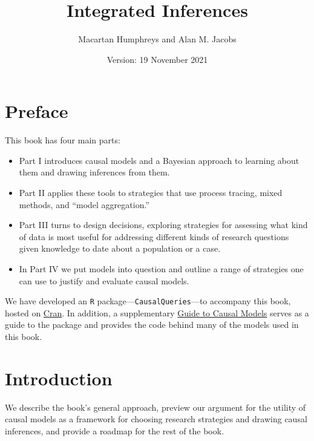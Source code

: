 \documentclass[
  12pt,
]{book}
\title{Integrated Inferences}
\author{Macartan Humphreys and Alan M. Jacobs}
\date{Version: 19 November 2021}
\newenvironment{headerbox}{
  \definecolor{shadecolor}{rgb}{0.8, 0.8, 0.8}  %
  \color{black}
  \begin{shaded}}{\end{shaded}}
\begin{document}
\maketitle

{
\setcounter{tocdepth}{1}
\tableofcontents
}
\hypertarget{preface}{%
\chapter*{Preface}\label{preface}}

This book has four main parts:

\begin{itemize}
\item
  Part I introduces causal models and a Bayesian approach to learning about them and drawing inferences from them.
\item
  Part II applies these tools to strategies that use process tracing, mixed methods, and ``model aggregation.''
\item
  Part III turns to design decisions, exploring strategies for assessing what kind of data is most useful for addressing different kinds of research questions given knowledge to date about a population or a case.
\item
  In Part IV we put models into question and outline a range of strategies one can use to justify and evaluate causal models.
\end{itemize}

We have developed an \texttt{R} package---\texttt{CausalQueries}---to accompany this book, hosted on \href{https://cran.r-project.org/web/packages/CausalQueries/index.html}{Cran}. In addition, a supplementary \href{https://macartan.github.io/causalmodels/}{Guide to Causal Models} serves as a guide to the package and provides the code behind many of the models used in this book.

\hypertarget{intro}{%
\chapter{Introduction}\label{intro}}

\begin{headerbox}
We describe the book's general approach, preview our argument for the utility of causal models as a framework for choosing research strategies and drawing causal inferences, and provide a roadmap for the rest of the book.

\end{headerbox}
\end{document}
